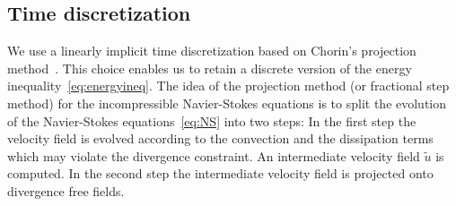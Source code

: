 \documentclass[10pt,letterpaper]{amsart}
\newcommand{\tu}{\widetilde{u}}
\theoremstyle{definition}{\newtheorem{definition}[lemma]{Definition}}
\numberwithin{equation}{section}
\begin{document}
\subsection{Time discretization} 
We use a   linearly implicit time discretization based on Chorin's projection method~\cite{Chorin1967,Chorin1968}. This choice enables us to retain a discrete version of the energy inequality~\eqref{eq:energyineq}.
The idea of the projection method (or fractional step method) for the incompressible Navier-Stokes equations is to split the evolution of the Navier-Stokes equations~\eqref{eq:NS} into two steps: In the first step the velocity field is evolved according to the convection and the dissipation terms which may violate the divergence constraint. An intermediate velocity field $\tu$ is computed. In the second step the intermediate velocity field is projected onto divergence free fields. 
\end{document}
